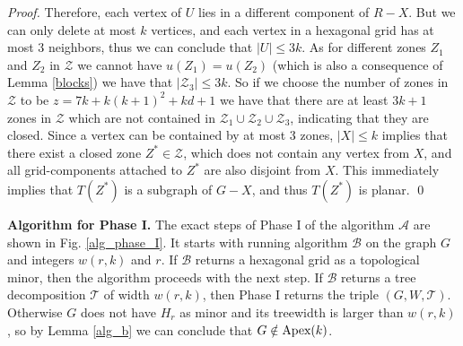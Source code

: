 \documentclass{llncs}
\begin{document}
\begin{proof}
Therefore, each vertex of $U$ lies in a different component of $R-X$.
But we can only delete at most $k$
vertices, and each vertex in a hexagonal grid has at most 3 neighbors, thus we can conclude
that $|U| \leq 3k$. As for different zones $Z_1$ and $Z_2$ in $\mathcal{Z}$ we cannot have $u(Z_1)=u(Z_2)$
(which is also a consequence of Lemma \ref{blocks}) we have that $|\mathcal{Z}_3| \leq 3k$.
So if we choose the number of zones in $\mathcal{Z}$ to be
$z=7k+k(k+1)^2+kd+1$ we have that there are at least $3k+1$ zones in $\mathcal{Z}$
which are not contained in $\mathcal{Z}_1 \cup \mathcal{Z}_2 \cup \mathcal{Z}_3$,
indicating that they are closed.
Since a vertex can be contained by at most 3 zones, $|X| \leq k$ implies that
there exist a closed zone $Z^* \in \mathcal{Z}$, which does not contain any vertex from $X$,
and all grid-components attached to $Z^*$ are also disjoint from $X$.
This immediately implies that $T(Z^*)$ is a subgraph of $G-X$, and thus $T(Z^*)$ is planar.
\qed
\end{proof}

\textbf{Algorithm for Phase I.}
The exact steps of Phase I of the algorithm $\mathcal{A}$ are
shown in Fig. \ref{alg_phase_I}.
It starts with running algorithm $\mathcal{B}$ on the graph $G$ and integers
$w(r,k)$ and $r$.
If $\mathcal{B}$ returns a hexagonal grid as a topological minor, then the algorithm
proceeds with the next step.
If $\mathcal{B}$ returns a tree decomposition $\mathcal{T}$ of width $w(r,k)$, then Phase I returns
the triple $(G,W,\mathcal{T})$. Otherwise $G$ does not have $H_r$ as minor and its
treewidth is larger than $w(r,k)$, so by Lemma \ref{alg_b} we can conclude that $G \notin \textup{Apex}(k)$.
\end{document}
